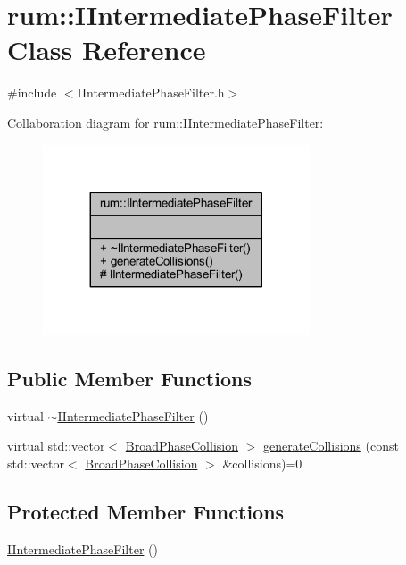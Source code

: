 \hypertarget{classrum_1_1_i_intermediate_phase_filter}{}\section{rum\+:\+:I\+Intermediate\+Phase\+Filter Class Reference}
\label{classrum_1_1_i_intermediate_phase_filter}


{\ttfamily \#include $<$I\+Intermediate\+Phase\+Filter.\+h$>$}



Collaboration diagram for rum\+:\+:I\+Intermediate\+Phase\+Filter\+:\nopagebreak
\begin{figure}[H]
\begin{center}
\leavevmode
\includegraphics[width=224pt]{classrum_1_1_i_intermediate_phase_filter__coll__graph}
\end{center}
\end{figure}
\subsection*{Public Member Functions}
\begin{DoxyCompactItemize}
\item 
virtual \mbox{\hyperlink{classrum_1_1_i_intermediate_phase_filter_af054f97965d94c980d7fe371dc5ab7b2}{$\sim$\+I\+Intermediate\+Phase\+Filter}} ()
\item 
virtual std\+::vector$<$ \mbox{\hyperlink{structrum_1_1_broad_phase_collision}{Broad\+Phase\+Collision}} $>$ \mbox{\hyperlink{classrum_1_1_i_intermediate_phase_filter_a36786cb08e9fa52d3551c1100cadf59d}{generate\+Collisions}} (const std\+::vector$<$ \mbox{\hyperlink{structrum_1_1_broad_phase_collision}{Broad\+Phase\+Collision}} $>$ \&collisions)=0
\end{DoxyCompactItemize}
\subsection*{Protected Member Functions}
\begin{DoxyCompactItemize}
\item 
\mbox{\hyperlink{classrum_1_1_i_intermediate_phase_filter_a9c65bdda0e41fd9528f1abf96ffca24c}{I\+Intermediate\+Phase\+Filter}} ()
\end{DoxyCompactItemize}



